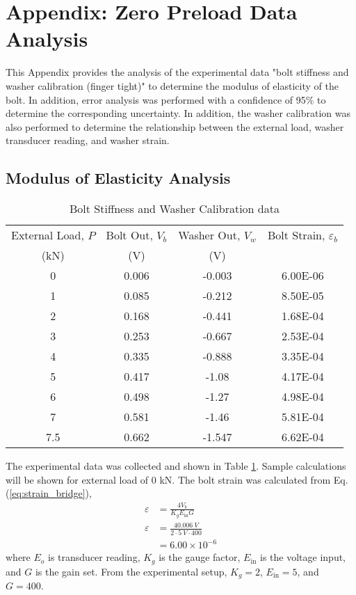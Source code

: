 \section{Appendix: Zero Preload Data Analysis}
\label{app:zero_preload_analysis}
This Appendix provides the analysis of the experimental data "bolt stiffness and washer calibration (finger tight)" to determine the modulus of elasticity of the bolt. In addition, error analysis was performed with a confidence of 95\% to determine the corresponding uncertainty. In addition, the washer calibration was also performed to determine the relationship between the external load, washer transducer reading, and washer strain.

\subsection{Modulus of Elasticity Analysis}
\begin{table}[h]
    \centering
    \caption{Bolt Stiffness and Washer Calibration data}
    \label{tab:modulus_of_elasticity_data}
    \begin{tabular}{cccc}
    \toprule
    External Load, $P$ & Bolt Out, $V_{b}$ & Washer Out, $V_{w}$ & Bolt Strain, $\varepsilon_b$ \\
    (kN) & (V) & (V) & \\
    \midrule
    0 & 0.006 & -0.003 & 6.00E-06 \\
    1 & 0.085 & -0.212 & 8.50E-05 \\
    2 & 0.168 & -0.441 & 1.68E-04 \\
    3 & 0.253 & -0.667 & 2.53E-04 \\
    4 & 0.335 & -0.888 & 3.35E-04 \\
    5 & 0.417 & -1.08 & 4.17E-04 \\
    6 & 0.498 & -1.27 & 4.98E-04 \\
    7 & 0.581 & -1.46 & 5.81E-04 \\
    7.5 & 0.662 & -1.547 & 6.62E-04 \\
    \bottomrule
    \end{tabular}
\end{table}
The experimental data was collected and shown in Table \ref{tab:modulus_of_elasticity_data}. Sample calculations will be shown for external load of 0 kN. The bolt strain was calculated from Eq. (\ref{eq:strain_bridge}),
\begin{align*}
    \varepsilon &= \frac{4 V_{b}}{K_g E_{\text{in}} G} \\
    \varepsilon &= \frac{4 \qty{0.006}{V}}{2 \cdot \qty{5}{V} \cdot 400} \\
    &= 6.00 \times 10^{-6}
\end{align*}
where $E_o$ is transducer reading, $K_g$ is the gauge factor, $E_{\text{in}}$ is the voltage input, and $G$ is the gain set. From the experimental setup, $K_g = 2$, $E_{\text{in}} = 5$, and $G = 400$. 

